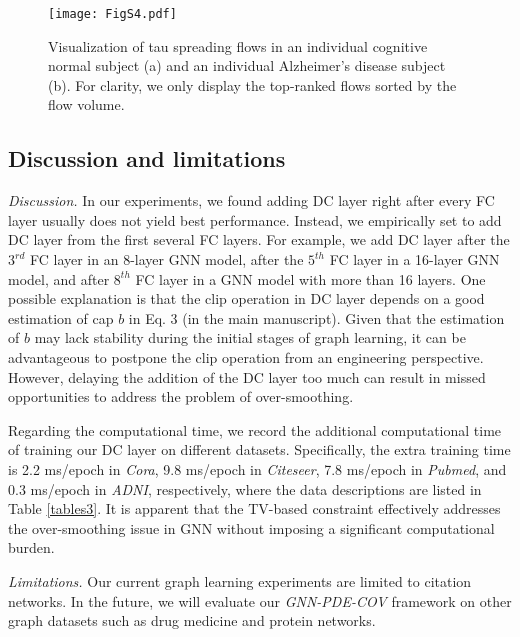 \documentclass{article}
\begin{document}
\begin{figure}[h]
  \centering
  \texttt{[image: FigS4.pdf]}
  \caption{Visualization of tau spreading flows in an individual cognitive normal subject (a) and an individual Alzheimer’s disease subject (b). For clarity, we only display the top-ranked flows sorted by the flow volume.}
  \label{figs4}
\end{figure}

\subsection{Discussion and limitations}
\textit{Discussion. }In our experiments, we found adding DC layer right after every FC layer usually does not yield best performance. Instead, we empirically set to add DC layer from the first several FC layers. For example, we add DC layer after the $3^{rd}$ FC layer in an 8-layer GNN model, after the $5^{th}$ FC layer in a 16-layer GNN model, and after $8^{th}$ FC layer in a GNN model with more than 16 layers. One possible explanation is that the clip operation in DC layer depends on a good estimation of cap $b$ in Eq. 3 (in the main manuscript). Given that the estimation of $b$ may lack stability during the initial stages of graph learning, it can be advantageous to postpone the clip operation from an engineering perspective. However, delaying the addition of the DC layer too much can result in missed opportunities to address the problem of over-smoothing.

Regarding the computational time, we record the additional computational time of training our DC layer on different datasets. Specifically, the extra training time is 2.2 ms/epoch in \textit{Cora}, 9.8 ms/epoch in \textit{Citeseer}, 7.8 ms/epoch in \textit{Pubmed}, and 0.3 ms/epoch in  \textit{ADNI}, respectively, where the data descriptions are listed in Table \ref{tables3}. It is apparent that the TV-based constraint effectively addresses the over-smoothing issue in GNN without imposing a significant computational burden.

\textit{Limitations.} Our current graph learning experiments are limited to citation networks. In the future, we will evaluate our \textit{GNN-PDE-COV} framework on other graph datasets such as drug medicine and protein networks.
\end{document}

